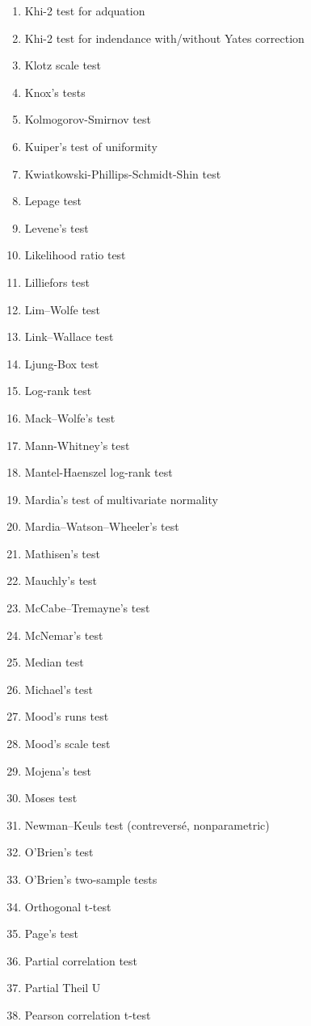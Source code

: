 \begin{itemize}
\begin{multicols}{3}
\begin{enumerate}
			\item Khi-2 test for adquation
			\item Khi-2 test for indendance with/without Yates correction
			\item Klotz scale test
			\item Knox's tests
			\item Kolmogorov-Smirnov test
			\item Kuiper's test of uniformity
			\item Kwiatkowski-Phillips-Schmidt-Shin test
			\item Lepage test
			\item Levene's test
			\item Likelihood ratio test
			\item Lilliefors test
			\item Lim–Wolfe test
			\item Link–Wallace test
			\item Ljung-Box test
			\item Log-rank test
			\item Mack–Wolfe's test
			\item Mann-Whitney's test
			\item Mantel-Haenszel log-rank test
			\item Mardia's test of multivariate normality
			\item Mardia–Watson–Wheeler's test
			\item Mathisen's test
			\item Mauchly's test
			\item McCabe–Tremayne's test
			\item McNemar's test
			\item Median test
			\item Michael's test
			\item Mood's runs test
			\item Mood's scale test
			\item Mojena's test
			\item Moses test
			\item Newman–Keuls test (contreversé, nonparametric)
			\item O'Brien's test
			\item O'Brien's two-sample tests
			\item Orthogonal t-test 
			\item Page's test
			\item Partial correlation test
			\item Partial Theil U
			\item Pearson correlation t-test

\end{enumerate}
\end{multicols}
\end{itemize}
